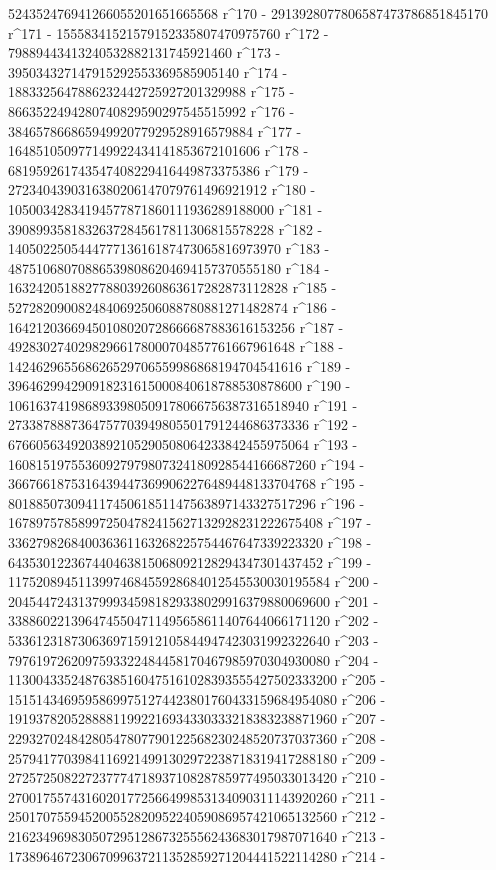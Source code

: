        524352476941266055201651665568 r^170 - 
       2913928077806587473786851845170 r^171 - 
       15558341521579152335807470975760 r^172 - 
       79889443413240532882131745921460 r^173 - 
       395034327147915292553369585905140 r^174 - 
       1883325647886232442725927201329988 r^175 - 
       8663522494280740829590297545515992 r^176 - 
       38465786686594992077929528916579884 r^177 - 
       164851050977149922434141853672101606 r^178 - 
       681959261743547408229416449873375386 r^179 - 
       2723404390316380206147079761496921912 r^180 - 
       10500342834194577871860111936289188000 r^181 - 
       39089935818326372845617811306815578228 r^182 - 
       140502250544477713616187473065816973970 r^183 - 
       487510680708865398086204694157370555180 r^184 - 
       1632420518827788039260863617282873112828 r^185 - 
       5272820900824840692506088780881271482874 r^186 - 
       16421203669450108020728666687883616153256 r^187 - 
       49283027402982966178000704857761667961648 r^188 - 
       142462965568626529706559986868194704541616 r^189 - 
       396462994290918231615000840618788530878600 r^190 - 
       1061637419868933980509178066756387316518940 r^191 - 
       2733878887364757703949805501791244686373336 r^192 - 
       6766056349203892105290508064233842455975064 r^193 - 
       16081519755360927979807324180928544166687260 r^194 - 
       36676618753164394473699062276489448133704768 r^195 - 
       80188507309411745061851147563897143327517296 r^196 - 
       167897578589972504782415627132928231222675408 r^197 - 
       336279826840036361163268225754467647339223320 r^198 - 
       643530122367440463815068092128294347301437452 r^199 - 
       1175208945113997468455928684012545530030195584 r^200 - 
       2045447243137999345981829338029916379880069600 r^201 - 
       3388602213964745504711495658611407644066171120 r^202 - 
       5336123187306369715912105844947423031992322640 r^203 - 
       7976197262097593322484458170467985970304930080 r^204 - 
       11300433524876385160475161028393555427502333200 r^205 - 
       15151434695958699751274423801760433159684954080 r^206 - 
       19193782052888811992216934330333218383238871960 r^207 - 
       22932702484280547807790122568230248520737037360 r^208 - 
       25794177039841169214991302972238718319417288180 r^209 - 
       27257250822723777471893710828785977495033013420 r^210 - 
       27001755743160201772566499853134090311143920260 r^211 - 
       25017075594520055282095224059086957421065132560 r^212 - 
       21623496983050729512867325556243683017987071640 r^213 - 
       17389646723067099637211352859271204441522114280 r^214 - 
